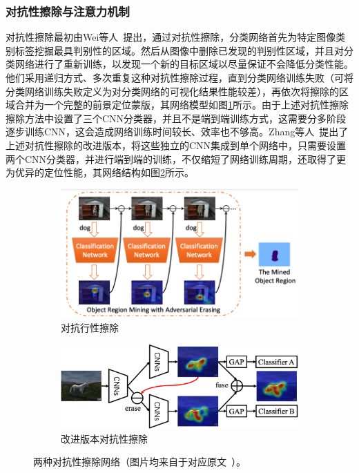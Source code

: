 \subsubsection*{对抗性擦除与注意力机制}
对抗性擦除最初由Wei等人~\cite{WeiFLCZY17}提出，通过对抗性擦除，分类网络首先为特定图像类别标签挖掘最具判别性的区域。然后从图像中删除已发现的判别性区域，并且对分类网络进行了重新训练，以发现一个新的目标区域以尽量保证不会降低分类性能。他们采用递归方式、多次重复这种对抗性擦除过程，直到分类网络训练失败（可将分类网络训练失败定义为对分类网络的可视化结果性能较差），再依次将擦除的区域合并为一个完整的前景定位蒙版，其网络模型如图\ref{subfig:adversarial_erasing}所示。由于上述对抗性擦除擦除方法中设置了三个CNN分类器，并且不是端到端训练方式，这需要分多阶段逐步训练CNN，这会造成网络训练时间较长、效率也不够高。Zhang等人~\cite{ZhangWF0H18}提出了上述对抗性擦除的改进版本，将这些独立的CNN集成到单个网络中，只需要设置两个CNN分类器，并进行端到端的训练，不仅缩短了网络训练周期，还取得了更为优异的定位性能，其网络结构如图\ref{subfig:improved_adversarial_learning}所示。

\begin{figure}[h!]
	\centering
	\begin{subfigure}{0.38\textwidth}
		\centering
		\includegraphics[width=1.0\textwidth]{figure/adversarial_erasing}
        \caption{对抗行性擦除~\cite{WeiFLCZY17}}
		\label{subfig:adversarial_erasing}
	\end{subfigure}
	\begin{subfigure}{0.57\textwidth}
		\centering
		\includegraphics[width=1.0\textwidth]{figure/improved_adversarial_learning}
		\caption{改进版本对抗性擦除~\cite{ZhangWF0H18}}
		\label{subfig:improved_adversarial_learning}
	\end{subfigure}
	\caption[两种对抗性擦除网络]{两种对抗性擦除网络（图片均来自于对应原文~\cite{WeiFLCZY17,ZhangWF0H18}）。}
	\label{mul_fig:weakly_supervised_localization}
\end{figure}


